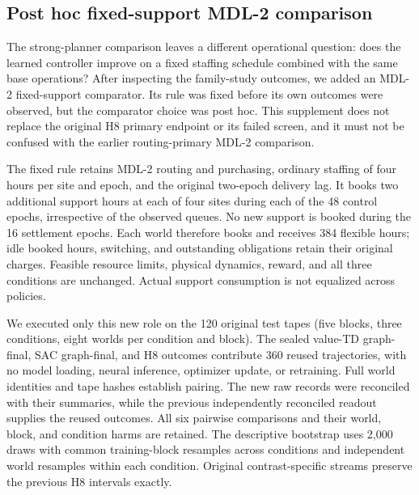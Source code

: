 \documentclass[preprint,review,12pt]{elsarticle}
\begin{document}
\subsection{Post hoc fixed-support MDL-2 comparison}
\label{sec:mdl2-fixed-supplement}
The strong-planner comparison leaves a different operational question:
does the learned controller improve on a fixed staffing schedule combined
with the same base operations? After inspecting the family-study outcomes,
we added an MDL-2 fixed-support comparator. Its rule was fixed before its
own outcomes were observed, but the comparator choice was post hoc. This
supplement does not replace the original H8 primary endpoint or its failed
screen, and it must not be confused with the earlier routing-primary MDL-2
comparison.

The fixed rule retains MDL-2 routing and purchasing, ordinary staffing of
four hours per site and epoch, and the original two-epoch delivery lag.
It books two additional support hours at each of four sites during each of
the 48 control epochs, irrespective of the observed queues. No new support
is booked during the 16 settlement epochs. Each world therefore books and
receives 384 flexible hours; idle booked hours, switching, and outstanding
obligations retain their original charges. Feasible resource limits,
physical dynamics, reward, and all three conditions are unchanged. Actual
support consumption is not equalized across policies.

We executed only this new role on the 120 original test tapes
(five blocks, three conditions, eight worlds per condition and block).
The sealed value-TD graph-final, SAC graph-final, and H8 outcomes contribute
360 reused trajectories, with no model loading, neural inference, optimizer
update, or retraining. Full world identities and tape hashes establish
pairing. The new raw records were reconciled with their summaries, while
the previous independently reconciled readout supplies the reused outcomes.
All six pairwise comparisons and their world, block, and condition harms
are retained. The descriptive bootstrap uses 2,000 draws with common
training-block resamples across conditions and independent world resamples
within each condition. Original contrast-specific streams preserve the
previous H8 intervals exactly.
\end{document}
